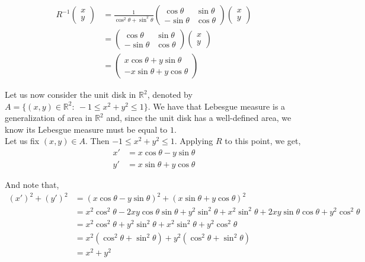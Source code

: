 \documentclass[12pt]{article}
\begin{document}
\begin{align*}
R^{-1}\begin{pmatrix}
x \\ y
\end{pmatrix} &= \frac{1}{\cos^2 \theta + \sin^2 \theta} \begin{pmatrix}
\cos \theta & \sin \theta\\
-\sin \theta & \cos \theta
\end{pmatrix}\begin{pmatrix}
x \\ y
\end{pmatrix}\\
&= \begin{pmatrix}
\cos \theta & \sin \theta\\
-\sin \theta & \cos \theta
\end{pmatrix}\begin{pmatrix}
x \\ y
\end{pmatrix}\\
&= \begin{pmatrix}
x \cos \theta + y \sin \theta \\ -x \sin \theta + y \cos \theta
\end{pmatrix}
\end{align*}

Let us now consider the unit disk in $\mathbb{R}^2$, denoted by $A = \{(x, y) \in \mathbb{R}^2: \ -1 \leq x^2 + y^2 \leq 1\}$. We have that Lebesgue measure is a generalization of area in $\mathbb{R}^2$ and, since the unit disk has a well-defined area, we know its Lebesgue measure must be equal to $1$.\\


Let us fix $(x, y) \in A$. Then $-1 \leq x^2 + y^2 \leq 1$. Applying $R$ to this point, we get,
\begin{align*}
x' &= x \cos \theta - y \sin \theta\\
y' &= x \sin \theta + y \cos \theta
\end{align*}

And note that,
\begin{align*}
(x')^2 + (y')^2 &= (x \cos \theta - y \sin \theta)^2 + (x \sin \theta + y \cos \theta)^2\\
&= x^2 \cos^2 \theta - 2xy \cos \theta \sin \theta + y^2 \sin^2 \theta + x^2 \sin^2 \theta + 2xy \sin \theta \cos \theta + y^2 \cos^2 \theta\\
&= x^2 \cos^2 \theta + y^2 \sin^2 \theta + x^2 \sin^2 \theta + y^2 \cos^2 \theta\\
&= x^2(\cos^2 \theta + \sin ^2 \theta) + y^2(\cos^2 \theta + \sin^2 \theta)\\
&= x^2 + y^2
\end{align*}
\end{document}
